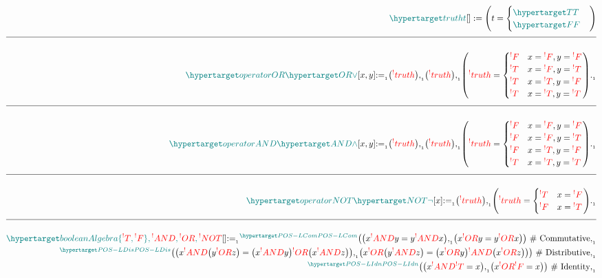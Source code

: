 \documentclass[a4paper]{article}
\makeatletter
\def\ml{\mleft}
\def\mr{\mright}
\newcommand{\defeq}{:=}
\newcommand{\eq}{=}
\newcommand{\cusand}{,}
\newcommand{\cusend}{.}
\newcommand{\cusnum}[2]{{#1}_{{\phantom{ }}_{#2}}}
\newcommand{\eqComment}[1]{\text{  \# #1}}
\newcommand{\n}{\\[1.5ex] \hline \nonumber \\[0ex]}
\newcommand{\m}{\nonumber \\}
\newcommand\rfrlist[1]{%
    \forcsvlist{\rfrlist@item}{#1}
}
\newcommand\rfrlist@item[1]{\rfr{#1}\\}
\newcommand{\thmlink}[2]{{}_{\substack{\rfrlist{#1}}}^{\dfn{#2}} }
\makeatother
\begin{document}
\begin{tcolorbox}
\begin{align}
     \dfn{truth} [t][] \defeq \ml(t \eq \begin{cases} \dfn{T} \\ \dfn{F} \end{cases}\mr) 
    \n \dfn{operatorOR} [\dfn{OR}[\lor]][x, y] \cusnum{\defeq}{1} \ml(\rfr{truth} [x][]\mr) \cusnum{\cusand}{1} \ml(\rfr{truth} [y][]\mr) \cusnum{\cusand}{1} \ml(\rfr{truth} [x \rfr{OR} y][] \eq \begin{cases} \rfr{F} & x \eq \rfr{F} \cusand y \eq \rfr{F} \\ \rfr{T} & x \eq \rfr{F} \cusand y \eq \rfr{T} \\ \rfr{T} & x \eq \rfr{T} \cusand y \eq \rfr{F} \\ \rfr{T} & x \eq \rfr{T} \cusand y \eq \rfr{T} \end{cases}\mr) \cusnum{\cusend}{1}
    \n \dfn{operatorAND} [\dfn{AND}[\land]][x, y] \cusnum{\defeq}{1} \ml(\rfr{truth} [x][]\mr) \cusnum{\cusand}{1} \ml(\rfr{truth} [y][]\mr) \cusnum{\cusand}{1} \ml(\rfr{truth} [x \rfr{AND} y][] \eq \begin{cases} \rfr{F} & x \eq \rfr{F} \cusand y \eq \rfr{F} \\ \rfr{F} & x \eq \rfr{F} \cusand y \eq \rfr{T} \\ \rfr{F} & x \eq \rfr{T} \cusand y \eq \rfr{F} \\ \rfr{T} & x \eq \rfr{T} \cusand y \eq \rfr{T} \end{cases}\mr) \cusnum{\cusend}{1}
    \n \dfn{operatorNOT} [\dfn{NOT}[\lnot]][x] \cusnum{\defeq}{1} \ml(\rfr{truth} [x][]\mr) \cusnum{\cusand}{1} \ml(\rfr{truth} [\rfr{NOT} x][] \eq \begin{cases} \rfr{T} & x \eq \rfr{F} \\ \rfr{F} & x \eq \rfr{T} \end{cases}\mr) \cusnum{\cusend}{1} 
    \n \dfn{booleanAlgebra} [\{\rfr{T}, \rfr{F}\}, \rfr{AND}, \rfr{OR}, \rfr{NOT}][] \cusnum{\defeq}{1} \thmlink{}{POS-LCom} \ml(\ml(x \rfr{AND} y \eq y \rfr{AND} x\mr) \cusnum{\cusand}{1} \ml(x \rfr{OR} y \eq y \rfr{OR} x\mr)\mr) \eqComment{Commutative} \cusnum{\cusand}{1}
\m \thmlink{}{POS-LDis} \ml(\ml(x \rfr{AND} \ml(y \rfr{OR} z\mr) \eq \ml(x \rfr{AND} y\mr) \rfr{OR} \ml(x \rfr{AND} z\mr)\mr) \cusnum{\cusand}{1} \ml(x \rfr{OR} \ml(y \rfr{AND} z\mr) \eq \ml(x \rfr{OR} y\mr) \rfr{AND} \ml(x \rfr{OR} z\mr)\mr)\mr) \eqComment{Distributive} \cusnum{\cusand}{1}
\m \thmlink{}{POS-LIdn} \ml(\ml(x \rfr{AND} \rfr{T} \eq x\mr) \cusnum{\cusand}{1} \ml(x \rfr{OR} \rfr{F} \eq x\mr)\mr) \eqComment{Identity} \cusnum{\cusand}{1}

\end{align}
\end{tcolorbox}
\end{document}
